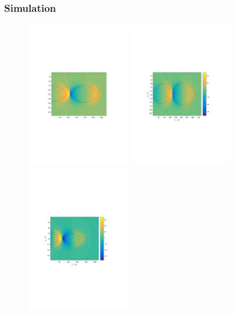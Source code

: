\subsubsection{Simulation}
\cite{Manahan_HotSpots_PRAB}
\begin{figure}
\includegraphics[width=0.4\textwidth]{simulations/images/raw/DC_lp_333mu.pdf}
\includegraphics[width=0.4\textwidth]{simulations/images/raw/DC_lp_149mu.pdf}
\includegraphics[width=0.4\textwidth]{simulations/images/raw/DC_Q_1nC.pdf}
\end{figure}


